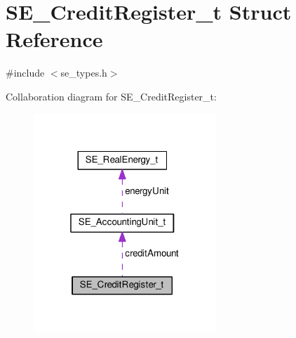 \hypertarget{structSE__CreditRegister__t}{}\section{S\+E\+\_\+\+Credit\+Register\+\_\+t Struct Reference}
\label{structSE__CreditRegister__t}


{\ttfamily \#include $<$se\+\_\+types.\+h$>$}



Collaboration diagram for S\+E\+\_\+\+Credit\+Register\+\_\+t\+:\nopagebreak
\begin{figure}[H]
\begin{center}
\leavevmode
\includegraphics[width=196pt]{structSE__CreditRegister__t__coll__graph}
\end{center}
\end{figure}
